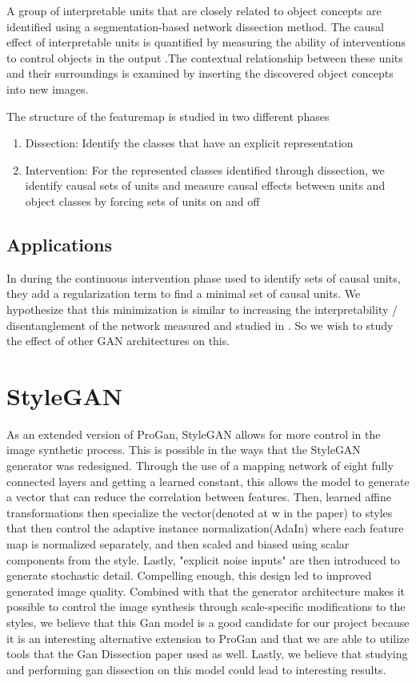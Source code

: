 \documentclass{article}
\begin{document}
 A group of interpretable units that are closely related to object concepts are identified using a segmentation-based network dissection method. The causal effect of interpretable units is quantified by measuring the ability of interventions to control objects in the output .The contextual relationship between these units and their surroundings is examined by inserting the discovered object concepts into new images.

The structure of the featuremap is studied in two different phases
\begin{enumerate} 
\item Dissection: Identify the classes that have an explicit representation
\item Intervention: For the represented classes identified through dissection, we identify causal sets of units and measure causal effects between units and object classes by forcing sets of units on and off 
\end{enumerate}

\subsection{Applications}

In \citet{gandissect2019} during the continuous intervention phase used to identify sets of causal units, they add a regularization term to find a minimal set of causal units. We hypothesize that this minimization is similar to increasing the interpretability / disentanglement of the network measured and studied in \cite{netdissect2017}. So we wish to study the effect of other GAN architectures on this.

\section{StyleGAN}

As an extended version of ProGan, StyleGAN allows for more control in the image synthetic process. This is possible in the ways that the StyleGAN generator was redesigned. Through the use of a mapping network of eight fully connected layers and getting a learned constant, this allows the model to generate a vector that can reduce the correlation between features. Then, learned affine transformations then specialize the vector(denoted at w in the paper) to styles that then control the adaptive instance normalization(AdaIn) where each feature map is normalized separately, and then scaled and biased using scalar components from the style. Lastly, "explicit noise inputs" are then introduced to generate stochastic detail. Compelling enough, this design led to improved generated image quality. Combined with that the generator architecture makes it possible to control the image synthesis through scale-specific modifications to the styles, we believe that this Gan model is a good candidate for our project because it is an interesting alternative extension to ProGan and that we are able to utilize tools that the Gan Dissection paper used as well. Lastly, we believe that studying and performing gan dissection on this model could lead to interesting results.
\end{document}
